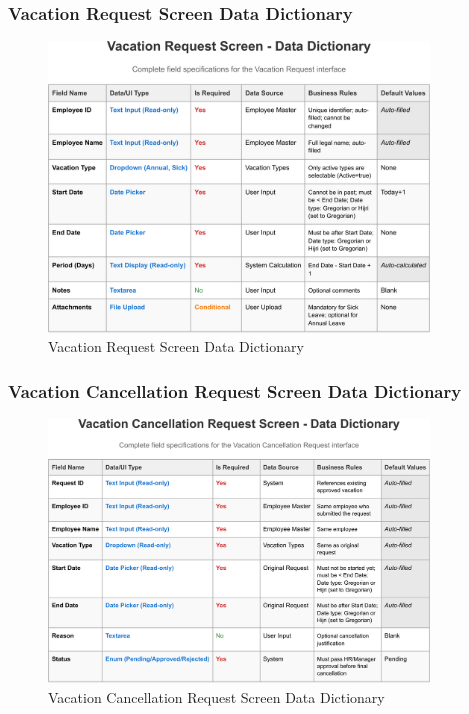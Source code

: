 \documentclass[12pt,a4paper]{article}
\begin{document}
\subsubsection{Vacation Request Screen Data Dictionary}
\begin{figure}[H]
\centering
\includegraphics[width=0.9\textwidth]{Data-Dictionary/Screen-Data-Dictionaries/Vacation-Request-Screen-Data-Dictionary/Vacation-Request-Screen-Data-Dictionary-1.png}
\caption{Vacation Request Screen Data Dictionary}
\label{fig:vacation-request-data-dict}
\end{figure}

\subsubsection{Vacation Cancellation Request Screen Data Dictionary}
\begin{figure}[H]
\centering
\includegraphics[width=0.9\textwidth]{Data-Dictionary/Screen-Data-Dictionaries/Vacation-Cancellation-Request-Screen-Data-Dictionary/Vacation-Cancellation-Request-Screen-Data-Dictionary-1.png}
\caption{Vacation Cancellation Request Screen Data Dictionary}
\label{fig:vacation-cancellation-data-dict}
\end{figure}
\end{document}
